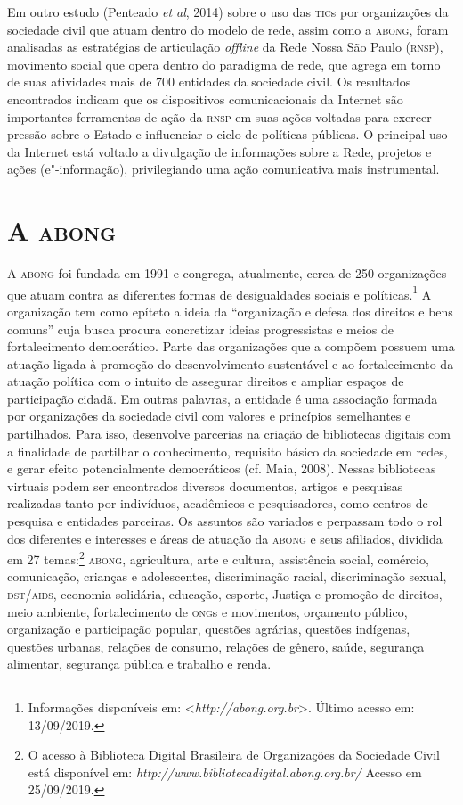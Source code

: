 Em outro estudo (Penteado \emph{et al}, 2014) sobre o uso das \textsc{tic}s por
organizações da sociedade civil que atuam dentro do modelo de rede,
assim como a \textsc{abong}, foram analisadas as estratégias de articulação
\emph{offline} da Rede Nossa São Paulo (\textsc{rnsp}), movimento social que opera
dentro do paradigma de rede, que agrega em torno de suas atividades mais
de 700 entidades da sociedade civil. Os resultados encontrados indicam
que os dispositivos comunicacionais da Internet são importantes
ferramentas de ação da \textsc{rnsp} em suas ações voltadas para exercer pressão
sobre o Estado e influenciar o ciclo de políticas públicas. O principal
uso da Internet está voltado a divulgação de informações sobre a Rede,
projetos e ações (e"-informação), privilegiando uma ação comunicativa
mais instrumental.

\section{A \textsc{abong}}

\noindent{}A \textsc{abong} foi fundada em 1991 e congrega, atualmente, cerca de 250
organizações que atuam contra as diferentes formas de desigualdades
sociais e políticas.\footnote{Informações disponíveis em:
  \textless{}\emph{http://abong.org.br}\textgreater{}.
  Último acesso em: 13/09/2019.} A organização tem como epíteto a ideia
da ``organização e defesa dos direitos e bens comuns'' cuja busca procura
concretizar ideias progressistas e meios de fortalecimento democrático.
Parte das organizações que a compõem possuem uma atuação ligada à
promoção do desenvolvimento sustentável e ao fortalecimento da atuação
política com o intuito de assegurar direitos e ampliar espaços de
participação cidadã. Em outras palavras, a entidade é uma associação
formada por organizações da sociedade civil com valores e princípios
semelhantes e partilhados. Para isso, desenvolve parcerias na criação de
bibliotecas digitais com a finalidade de partilhar o conhecimento,
requisito básico da sociedade em redes, e gerar efeito potencialmente
democráticos (cf. Maia, 2008). Nessas bibliotecas virtuais podem ser
encontrados diversos documentos, artigos e pesquisas realizadas tanto
por indivíduos, acadêmicos e pesquisadores, como centros de pesquisa e
entidades parceiras. Os assuntos são variados e perpassam todo o rol dos
diferentes e interesses e áreas de atuação da \textsc{abong} e seus afiliados,
dividida em 27 temas:\footnote{O acesso à Biblioteca Digital Brasileira
  de Organizações da Sociedade Civil está disponível em:
  \emph{http://www.bibliotecadigital.abong.org.br/}
  Acesso em 25/09/2019.} \textsc{abong}, agricultura, arte e cultura,
assistência social, comércio, comunicação, crianças e adolescentes,
discriminação racial, discriminação sexual, \textsc{dst}/\textsc{aids}, economia
solidária, educação, esporte, Justiça e promoção de direitos, meio
ambiente, fortalecimento de \textsc{ong}s e movimentos, orçamento público,
organização e participação popular, questões agrárias, questões
indígenas, questões urbanas, relações de consumo, relações de gênero,
saúde, segurança alimentar, segurança pública e trabalho e renda.

